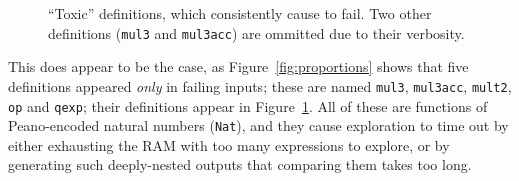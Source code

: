\begin{figure}
  \iffalse
  \begin{verbatim}
    (define-fun-rec mul3 ((x Nat) (y Nat) (z Nat)) Nat
      (match x
        (case Z Z)                          ;; Base case for 0 * y * z
        (case (S x2)
          (match y
            (case Z Z)                      ;; Base case for x * 0 * z
            (case (S x3)
              (match z
                (case Z Z)                  ;; Base case for x * y * 0
                (case (S x4)
                  (match x2
                    (case Z
                      (match x3
                        (case Z
                          (match x4
                            (case Z (S Z))  ;; Base case for 1 * 1 * 1
                            (case (S x5)
                              (S (add3 (mul3 Z Z x4)
                                       (add3 (mul3 (S Z) Z x4)
                                             (mul3 Z (S Z) x4)
                                             (mul3 Z Z (S Z)))
                                       (add3 Z Z x4))))))
                        (case (S x6)
                          (S (add3 (mul3 Z x3 x4)
                                   (add3 (mul3 (S Z) x3 x4)
                                         (mul3 Z (S Z) x4)
                                         (mul3 Z x3 (S Z)))
                                   (add3 Z x3 x4))))))
                    (case (S x7)
                      (S (add3 (mul3 x2 x3 x4)
                               (add3 (mul3 (S Z) x3 x4)
                                     (mul3 x2 (S Z) x4)
                                     (mul3 x2 x3 (S Z)))
                               (add3 x2 x3 x4))))))))))))
  \end{verbatim}
  \fi
  \caption{``Toxic'' definitions, which consistently cause \quickspec{} to fail. Two
    other definitions (\texttt{mul3} and \texttt{mul3acc}) are ommitted due to
    their verbosity.}
  \label{fig:faildefs}
\end{figure}

This does appear to be the case, as Figure~\ref{fig:proportions} shows that five
definitions appeared \emph{only} in failing inputs; these are named
\texttt{mul3}, \texttt{mul3acc}, \texttt{mult2}, \texttt{op} and \texttt{qexp};
their definitions appear in Figure~\ref{fig:faildefs}. All of these are
functions of Peano-encoded natural numbers (\texttt{Nat}), and they cause
exploration to time out by either exhausting the RAM with too many expressions
to explore, %
or by generating such deeply-nested outputs that comparing them takes too long.

